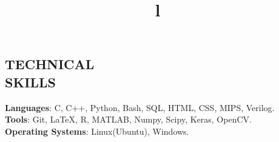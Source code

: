 \documentclass[margin]{res}
\begin{document}
\begin{resume}

\section{TECHNICAL\\SKILLS}
\textbf{Languages}: C, C++, Python,  Bash, SQL, HTML, CSS, MIPS, Verilog.
\\
\textbf{Tools}:  Git, \LaTeX, R, MATLAB, Numpy, Scipy, Keras, OpenCV.
\\
\textbf{Operating Systems}:  Linux(Ubuntu), Windows.

\begin{format}
\title{l}\\
\\
\body\\
\end{format}


\end{resume}
\end{document}
